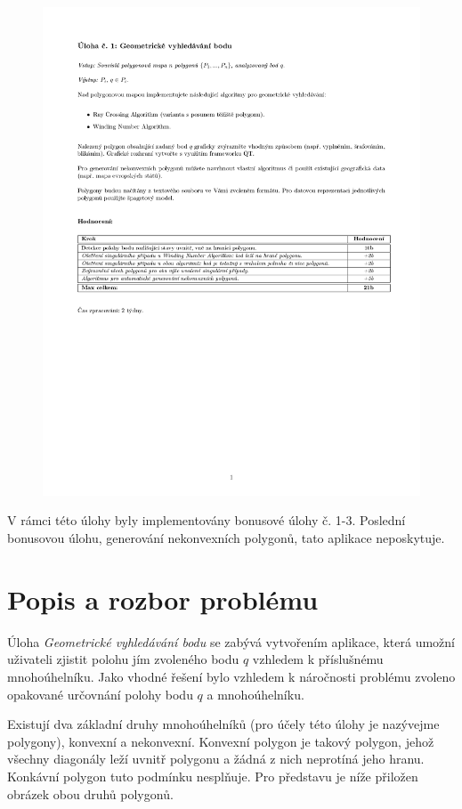 \documentclass[a4paper, 12pt]{article}
\begin{document}
\begin{figure}[h!]
	\includegraphics[clip, trim=0cm 10cm 0cm 3cm, width=1.0\textwidth]{./pictures/zadani.pdf}
\end{figure}

V rámci této úlohy byly implementovány bonusové úlohy č. 1-3. Poslední bonusovou úlohu, generování nekonvexních polygonů, tato aplikace neposkytuje.
\clearpage

\section{Popis a rozbor problému}
Úloha \textit{Geometrické vyhledávání bodu} se zabývá vytvořením aplikace, která umožní uživateli zjistit polohu jím zvoleného bodu $q$ vzhledem k příslušnému mnohoúhelníku. Jako vhodné řešení bylo vzhledem k náročnosti problému zvoleno opakované určovnání polohy bodu $q$ a mnohoúhelníku.

Existují dva základní druhy mnohoúhelníků (pro účely této úlohy je nazývejme polygony), konvexní a nekonvexní. Konvexní polygon je takový polygon, jehož všechny diagonály leží uvnitř polygonu a žádná z nich neprotíná jeho hranu. Konkávní polygon tuto podmínku nesplňuje. Pro představu je níže přiložen obrázek obou druhů polygonů.
\end{document}
